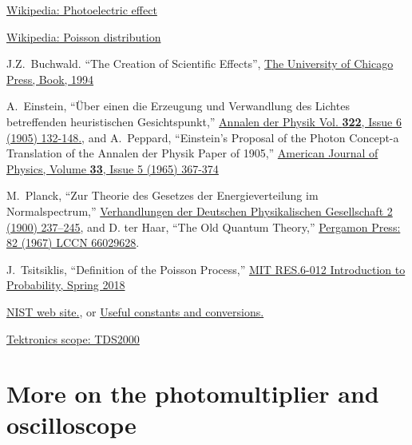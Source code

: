 \documentclass[10pt,aps,twocolumn,secnumarabic,balancelastpage,amsmath,amssymb,nofootinbib,floatfix]{revtex4}
\begin{document}
\begin{thebibliography}{99}

  \href{https://en.wikipedia.org/wiki/Photoelectric\_effect}{Wikipedia: Photoelectric effect}

  \href{https://en.wikipedia.org/wiki/Poisson\_distribution}{Wikipedia: Poisson distribution}

  J.Z.~Buchwald.
  ``The Creation of Scientific Effects'',
  \href{https://press.uchicago.edu/ucp/books/book/chicago/C/bo3636276.html}%
       {The University of Chicago Press, Book, 1994}

  A.~Einstein,
  ``\"Uber einen die Erzeugung und Verwandlung des Lichtes betreffenden heuristischen Gesichtspunkt,''
  \href{http://users.physik.fu-berlin.de/~kleinert/files/eins\_lq.pdf}%
       {Annalen der Physik Vol. {\bf 322}, Issue 6 (1905) 132-148.}, and
  A.~Peppard,
  ``Einstein's Proposal of the Photon Concept-a Translation of the Annalen der Physik Paper of 1905,''
  \href{https://aapt.scitation.org/doi/10.1119/1.1971542}%
       {American Journal of Physics, Volume {\bf 33}, Issue 5 (1965) 367-374}

  M.~Planck,
  ``Zur Theorie des Gesetzes der Energieverteilung im Normalspectrum,''
  \href{https://archive.org/stream/verhandlungende01goog#page/n247/mode/2up}{Verhandlungen der Deutschen Physikalischen Gesellschaft 2 (1900) 237–245}, and
  D. ter Haar,
  ``The Old Quantum Theory,''
  \href{https://openlibrary.org/books/OL5997151M/The\_old\_quantum\_theory}{Pergamon Press: 82 (1967) LCCN 66029628}.

  J.~Tsitsiklis,
  ``Definition of the Poisson Process,''
  \href{https://www.youtube.com/watch?v=D\_EGYzqmapc}{MIT RES.6-012 Introduction to Probability, Spring 2018}

  \href{https://physics.nist.gov/cgi-bin/cuu/Value?h}{NIST web site.}, or
  \href{http://www.physics.rutgers.edu/~abrooks/342/constants.html}{Useful constants and conversions.}

  \href{https://www.tek.com/oscilloscope/tds2000-digital-storage-oscilloscope}{Tektronics scope: TDS2000}

\end{thebibliography}

\clearpage
\appendix
\section{More on the photomultiplier and oscilloscope}
\end{document}
